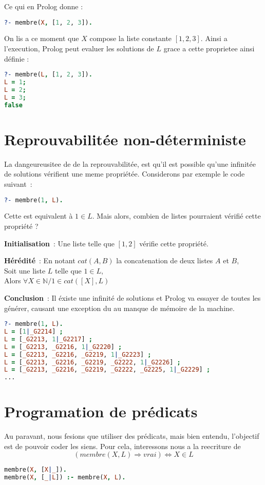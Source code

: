  Ce qui en Prolog donne :
\begin{lstlisting}[language=Prolog]
?- membre(X, [1, 2, 3]).
\end{lstlisting}

On lis a ce moment que $X$ compose la liste constante $[1, 2, 3]$. Ainsi a
l'execution, Prolog peut evaluer les solutions de $L$ grace a cette proprietee
ainsi définie :

\begin{lstlisting}[language=Prolog]
?- membre(L, [1, 2, 3]).
L = 1;
L = 2;
L = 3;
false
\end{lstlisting}


\section{Reprouvabilitée non-déterministe}

La dangeureusitee de de la reprouvabilitée, est qu'il est possible qu'une
infinitée de solutions vérifient une meme propriétée. Considerons par exemple
le code suivant~:

\begin{lstlisting}[language=Prolog]
?- membre(1, L).
\end{lstlisting}

Cette est equivalent à $1 \in L$. Mais alors, combien de listes
pourraient vérifié cette propriété ?

\textbf{Initialisation}~: Une liste telle que $[1, 2]$ vérifie cette propriété.

\textbf{Hérédité}~: En notant $cat(A, B)$ la concatenation de deux listes $A$ et
$B$,\\
Soit une liste $L$ telle que $1 \in L$,\\
Alors $\forall X \in \mathbb{N} / 1 \in cat([X], L)$

\textbf{Conclusion}~: Il éxiste une infinité de solutions et Prolog va essayer
de toutes les générer, causant une exception du au manque de mémoire de la
machine.

\begin{lstlisting}[language=Prolog]
?- membre(1, L).
L = [1|_G2214] ;
L = [_G2213, 1|_G2217] ;
L = [_G2213, _G2216, 1|_G2220] ;
L = [_G2213, _G2216, _G2219, 1|_G2223] ;
L = [_G2213, _G2216, _G2219, _G2222, 1|_G2226] ;
L = [_G2213, _G2216, _G2219, _G2222, _G2225, 1|_G2229] ;
...
\end{lstlisting}


\section{Programation de prédicats}

Au paravant, nous fesions que utiliser des prédicats, mais bien entendu,
l'objectif est de pouvoir coder les siens. Pour cela, interessons nous a la
reecriture de
\[(membre(X, L) \Rightarrow vrai) \Leftrightarrow X \in L\]

\begin{lstlisting}[language=Prolog]
membre(X, [X|_]).
membre(X, [_|L]) :- membre(X, L).
\end{lstlisting}
